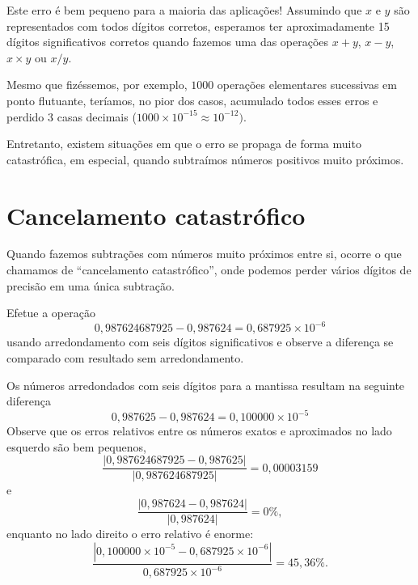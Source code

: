Este erro é bem pequeno para a maioria das aplicações! Assumindo que $x$ e $y$ são representados com todos dígitos corretos, esperamos ter aproximadamente 15 dígitos significativos corretos quando fazemos uma das operações $x+y$, $x-y$, $x\times y$ ou $x/y$.


Mesmo que fizéssemos, por exemplo, $1000$ operações elementares sucessivas em ponto flutuante, teríamos, no pior dos casos, acumulado todos esses erros e perdido $3$ casas decimais ($1000\times 10^{-15} \approx 10^{-12})$.

Entretanto, existem situações em que o erro se propaga de forma muito catastrófica, em especial, quando subtraímos números positivos muito próximos.

\section{Cancelamento catastrófico}

Quando fazemos subtrações com números muito próximos entre si, ocorre o que chamamos de ``cancelamento catastrófico'', onde podemos perder vários dígitos de precisão em uma única subtração.

\begin{ex}Efetue a operação
  \begin{equation}
    0,987624687925-0,987624=0,687925\times 10^{-6}
  \end{equation}
usando arredondamento com seis dígitos significativos e observe a diferença se comparado com resultado sem arredondamento.
\end{ex}
\begin{sol}
Os números arredondados com seis dígitos para a mantissa resultam na seguinte diferença
\begin{equation}
0,987625-0,987624=0,100000\times 10^{-5}
\end{equation}
Observe que os erros relativos entre os números exatos e aproximados no lado esquerdo são bem pequenos,
\begin{equation}
  \frac{|0,987624687925-0,987625|}{|0,987624687925|}=0,00003159
\end{equation}
e
\begin{equation}
  \frac{|0,987624-0,987624|}{|0,987624|}=0\%,
\end{equation}
enquanto no lado direito o erro relativo é enorme:
\begin{equation}
\frac{|0,100000\times 10^{-5}-0,687925\times 10^{-6}|}{0,687925\times 10^{-6}}=45,36\%.
\end{equation}
\end{sol}


